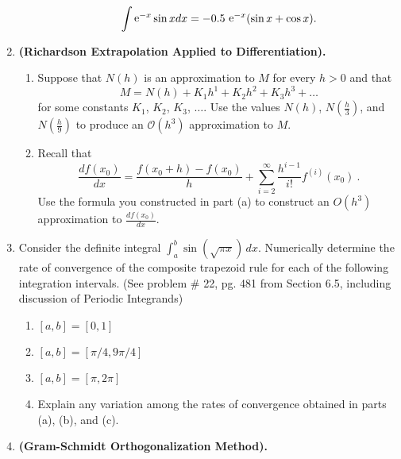 \documentclass [12pt]{article}
\begin{document}
\begin{enumerate}
\begin{enumerate}
$$
\int \mathop{\rm e}\nolimits^{-x} \sin x dx =
        -0.5\, \mathop{\rm e}\nolimits^{-x} (\sin x + \cos x).
$$

\end{enumerate}



\item  \textbf{(Richardson Extrapolation Applied to Differentiation).} 
\begin{enumerate}
\item Suppose that $N(h)$ is an approximation to $M$ for every
$h>0$ and that
\[
M=N(h)+K_{1}h^{1}+K_{2}h^{2}+K_{3}h^{3}+\ldots
\]
for some constants $K_{1}$, $K_{2}$, $K_{3}$, $\ldots$. Use the
values $N(h)$, $N(\frac{h}{3})$, and $N(\frac{h}{9})$ to produce
an ${\mathcal{O}}(h^{3})$ approximation to $M$.

\item Recall that
\[
\frac{df(x_{0})}{dx}=\frac{f(x_{0}+h)-f(x_{0})}{h}+
\sum_{i=2}^{\infty}\frac{h^{i-1}}{i!}f^{(i)}(x_{0})~.
\]
Use the formula you constructed in part (a) to construct an
$O(h^{3})$ approximation to $\frac{df(x_{0})}{dx}$.
\end{enumerate}


\item Consider the definite integral $\int_a^b \sin(\sqrt{\pi x})\,dx$. Numerically determine the rate of convergence of the composite trapezoid rule for each of the following integration intervals. (See problem \# 22, pg. 481 from Section 6.5, including discussion of Periodic Integrands)

\begin{enumerate}

\item $[a,b]=[0,1]$

\item $[a,b]=[\pi/4, 9\pi/4]$

\item $[a,b]=[\pi,2\pi]$

\item Explain any variation among the rates of convergence obtained in parts (a), (b), and (c).

\end{enumerate}

\item  \textbf{(Gram-Schmidt Orthogonalization Method).}  

\begin{enumerate}


\end{enumerate}
\end{enumerate}
\end{document}
